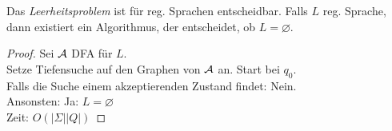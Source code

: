 \begin{Satz}[name={[Leerheitsproblem]}]\label{satz:leerheitsproblem}
	Das \emph{Leerheitsproblem} ist für reg. Sprachen entscheidbar.
	Falls $L$ reg. Sprache, dann existiert ein Algorithmus, der entscheidet, ob $L=\varnothing$.
\end{Satz}
\begin{proof}
	Sei $\mathcal{A}$ \ac{DFA} für $L$.\\
	Setze Tiefensuche auf den Graphen von $\mathcal{A}$ an. Start bei $q_0$.\\
	Falls die Suche einem akzeptierenden Zustand findet: Nein.\\
	Ansonsten: Ja: $L=\varnothing$\\
	Zeit: $O(|\Sigma||Q|)$
\end{proof}

